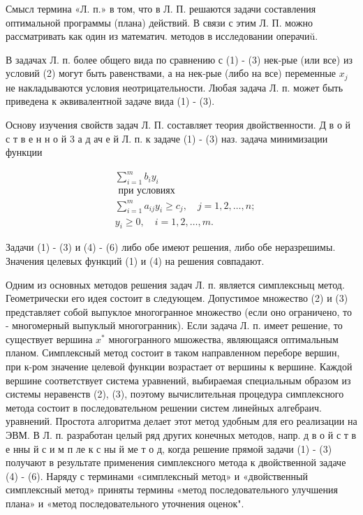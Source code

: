 \documentclass[10pt]{article}
\begin{document}
Смысл термина «Л. п.» в том, что в Л. П. решаются задачи составления оптимальной программы (плана) действий. В связи с этим Л. П. можно рассматривать как один из математич. методов в исследовании операчиŭ.



В задачах Л. п. более общего вида по сравнению с (1) - (3) нек-рые (или все) из условий (2) могут быть равенствами, а на нек-рые (либо на все) переменные $x_{j}$ не накладываются условия неотрицательности. Любая задача Л. п. может быть приведена к әквивалентной задаче вида (1) - (3).



Основу изучения свойств задач Л. П. составляет теория двойственности. Д в о й с т в е н н о й 3 а д ач е й Л. п. к задаче (1) - (3) наз. задача минимизации функции



\[

\begin{aligned}

& \sum_{i=1}^{m} b_{i} y_{i} \\

& \text { при условиях } \\

& \sum_{i=1}^{m} a_{i j} y_{i} \geqslant c_{j}, \quad j=1,2, \ldots, n ; \\

& y_{i} \geqslant 0, \quad i=1,2, \ldots, m .

\end{aligned}

\]



Задачи (1) - (3) и (4) - (6) либо обе имеют решения, либо обе неразрешимы. Значения целевых функций (1) и (4) на решения совпадают.



Одним из основных методов решения задач Л. п. является симплексныц метод. Геометрически его идея состоит в следующем. Допустимое множество (2) и (3) представляет собой выпуклое многогранное множество (если оно ограничено, то - многомерный выпуклый многогранник). Если задача Л. п. имеет решение, то существует вершина $x^{*}$ многогранного мшожества, являющаяся оптимальным планом. Симплексный метод состоит в таком направленном переборе вершин, при к-ром значение целевой функции возрастает от вершины к вершине. Каждой вершине соответствует система уравнений, выбираемая специальным образом из системы неравенств (2), (3), поэтому вычислительная процедура симплексного метода состоит в последовательном решении систем линейных алгебраич. уравнений. Простота алгоритма делает этот метод удобным для его реализации на ЭВМ. В Л. п. разработан целый ряд других конечных методов, напр. д в о й с т в е нны й с и м п ле к с ны й ме т о д, когда решение прямой задачи (1) - (3) получают в результате применения симплексного метода к двойственной задаче (4) - (6). Наряду с терминами «симплексный метод» и «двойственный симплексный метод» приняты термины «метод последовательного улучшения плана» и «метод последовательного уточнения оценок".
\end{document}
